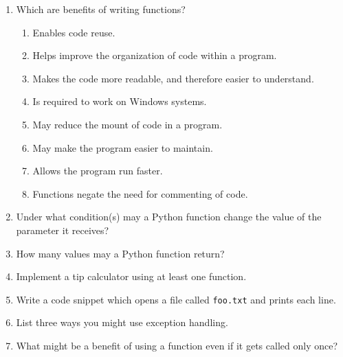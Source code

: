 \documentclass[letter,10pt]{article}
\begin{document}
\begin{enumerate}
    \item Which are benefits of writing functions?
    \begin{enumerate}
        \item Enables code reuse.
        \item Helps improve the organization of code within a program.
        \item Makes the code more readable, and therefore easier to understand.
        \item Is required to work on Windows systems.
        \item May reduce the mount of code in a program.
        \item May make the program easier to maintain.
        \item Allows the program run faster.
        \item Functions negate the need for commenting of code.
    \end{enumerate}

    \item Under what condition(s) may a Python function change the value of the parameter it receives?

    \item How many values may a Python function return?

    \item Implement a tip calculator using at least one function.

    \item Write a code snippet which opens a file called \texttt{foo.txt} and prints each line.

    \item List three ways you might use exception handling.

    \item What might be a benefit of using a function even if it gets called only once?

\end{enumerate}
\end{document}
